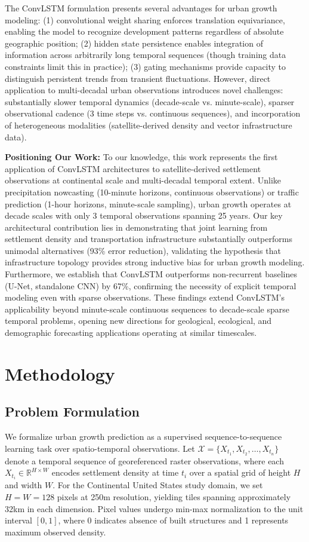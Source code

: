 \documentclass[conference]{IEEEtran}
\begin{document}
The ConvLSTM formulation presents several advantages for urban growth modeling: (1) convolutional weight sharing enforces translation equivariance, enabling the model to recognize development patterns regardless of absolute geographic position; (2) hidden state persistence enables integration of information across arbitrarily long temporal sequences (though training data constraints limit this in practice); (3) gating mechanisms provide capacity to distinguish persistent trends from transient fluctuations. However, direct application to multi-decadal urban observations introduces novel challenges: substantially slower temporal dynamics (decade-scale vs. minute-scale), sparser observational cadence (3 time steps vs. continuous sequences), and incorporation of heterogeneous modalities (satellite-derived density and vector infrastructure data).

\textbf{Positioning Our Work:} To our knowledge, this work represents the first application of ConvLSTM architectures to satellite-derived settlement observations at continental scale and multi-decadal temporal extent. Unlike precipitation nowcasting (10-minute horizons, continuous observations) or traffic prediction (1-hour horizons, minute-scale sampling), urban growth operates at decade scales with only 3 temporal observations spanning 25 years. Our key architectural contribution lies in demonstrating that joint learning from settlement density and transportation infrastructure substantially outperforms unimodal alternatives (93\% error reduction), validating the hypothesis that infrastructure topology provides strong inductive bias for urban growth modeling. Furthermore, we establish that ConvLSTM outperforms non-recurrent baselines (U-Net, standalone CNN) by 67\%, confirming the necessity of explicit temporal modeling even with sparse observations. These findings extend ConvLSTM's applicability beyond minute-scale continuous sequences to decade-scale sparse temporal problems, opening new directions for geological, ecological, and demographic forecasting applications operating at similar timescales.

\section{Methodology}

\subsection{Problem Formulation}
We formalize urban growth prediction as a supervised sequence-to-sequence learning task over spatio-temporal observations. Let $\mathcal{X} = \{X_{t_1}, X_{t_2}, \ldots, X_{t_n}\}$ denote a temporal sequence of georeferenced raster observations, where each $X_{t_i} \in \mathbb{R}^{H \times W}$ encodes settlement density at time $t_i$ over a spatial grid of height $H$ and width $W$. For the Continental United States study domain, we set $H = W = 128$ pixels at 250m resolution, yielding tiles spanning approximately 32km in each dimension. Pixel values undergo min-max normalization to the unit interval $[0,1]$, where 0 indicates absence of built structures and 1 represents maximum observed density.
\end{document}
